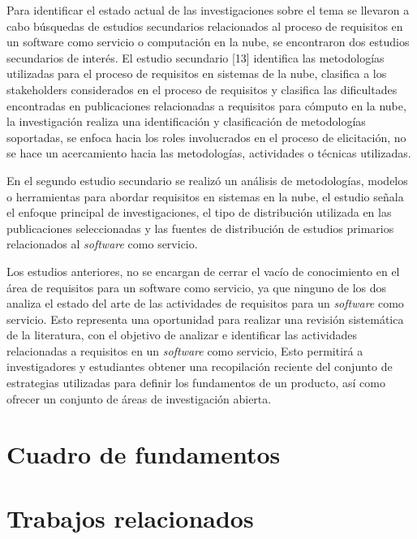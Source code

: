 \documentclass[conference,onecolumn,10pt]{IEEEtran}
\begin{document}
Para identificar el estado actual de las investigaciones sobre el tema se llevaron a cabo búsquedas de estudios secundarios relacionados al proceso de requisitos 
en un software como servicio o computación en la nube, se encontraron dos estudios secundarios de interés. El estudio secundario [13] identifica las metodologías 
utilizadas para el proceso de requisitos en sistemas de la nube, clasifica a los stakeholders considerados en el proceso de requisitos y clasifica las dificultades 
encontradas en publicaciones relacionadas a requisitos para cómputo en la nube, la investigación realiza una identificación y clasificación de metodologías soportadas, 
se enfoca hacia los roles involucrados en el proceso de elicitación, no se hace un acercamiento hacia las metodologías, actividades o técnicas utilizadas.  

En el segundo estudio secundario \cite{wanderley2017requirements} se realizó un análisis de metodologías, modelos o herramientas para abordar requisitos en sistemas en la nube, el estudio 
señala el enfoque principal de investigaciones, el tipo de distribución utilizada en las publicaciones seleccionadas y las fuentes de distribución de 
estudios primarios relacionados al \emph{software} como servicio. 

Los estudios anteriores, no se encargan de cerrar el vacío de conocimiento en el área de requisitos para un software como servicio, ya que ninguno de los dos 
analiza el estado del arte de las actividades de requisitos para un \emph{software} como servicio. Esto representa una oportunidad para realizar una revisión
sistemática de la literatura, con el objetivo de analizar e identificar las actividades relacionadas a requisitos en un \emph{software} como servicio,
Esto permitirá a investigadores y estudiantes obtener una recopilación reciente del conjunto de estrategias utilizadas para definir los fundamentos de un producto, 
así como ofrecer un conjunto de áreas de investigación abierta.

\section{Cuadro de fundamentos}
\newpage

\section{Trabajos relacionados}
\newpage
\end{document}
